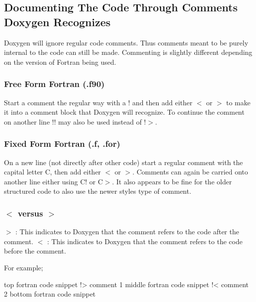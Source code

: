 \subsection*{Documenting The Code Through Comments Doxygen Recognizes}

Doxygen will ignore regular code comments. Thus comments meant to be purely internal to the code can still be made. Commenting is slightly different depending on the version of Fortran being used.

\subsubsection*{Free Form Fortran (.f90)}

Start a comment the regular way with a \textquotesingle{}!\textquotesingle{} and then add either \textquotesingle{}$<$\textquotesingle{} or \textquotesingle{}$>$\textquotesingle{} to make it into a comment block that Doxygen will recognize. To continue the comment on another line \textquotesingle{}!!\textquotesingle{} may also be used instead of \textquotesingle{}!$>$\textquotesingle{}.

\subsubsection*{Fixed Form Fortran (.f, .for)}

On a new line (not directly after other code) start a regular comment with the capital letter \textquotesingle{}C\textquotesingle{}, then add either \textquotesingle{}$<$\textquotesingle{} or \textquotesingle{}$>$\textquotesingle{}. Comments can again be carried onto another line either using \textquotesingle{}C!\textquotesingle{} or \textquotesingle{}C$>$\textquotesingle{}. It also appears to be fine for the older structured code to also use the newer style\textquotesingle{}s type of comment.

\subsubsection*{\textquotesingle{}$<$\textquotesingle{} versus \textquotesingle{}$>$\textquotesingle{}}

\textquotesingle{}$>$\textquotesingle{} \+: This indicates to Doxygen that the comment refers to the code after the comment. \textquotesingle{}$<$\textquotesingle{} \+: This indicates to Doxygen that the comment refers to the code before the comment.

For example; \begin{DoxyVerb}top fortran code snippet
!> comment 1
middle fortran code snippet
!< comment 2
bottom fortran code snippet
\end{DoxyVerb}


